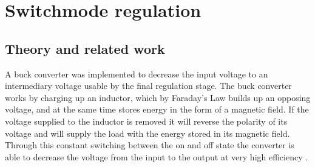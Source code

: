\chapter{Switchmode regulation}
\section{Theory and related work} \label{sec:literature_switchmode}
A buck converter was implemented to decrease the input voltage to an intermediary voltage usable by the final regulation stage. The buck converter works by charging up an inductor, which by Faraday's Law builds up an opposing voltage, and at the same time stores energy in the form of a magnetic field. If the voltage supplied to the inductor is removed it will reverse the polarity of its voltage and will supply the load with the energy stored in its magnetic field. Through this constant switching between the on and off state the converter is able to decrease the voltage from the input to the output at very high efficiency \cite{Gao:2015}.

